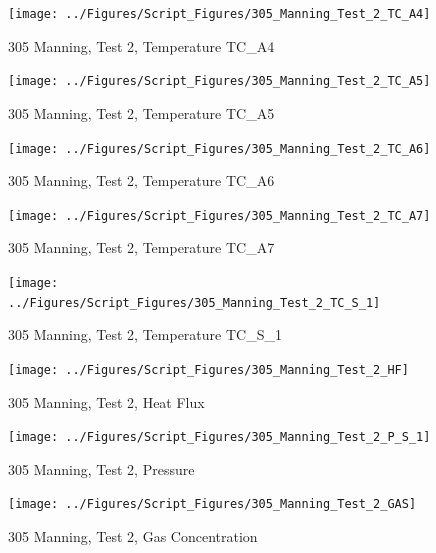 \documentclass[12pt,oneside]{book}
\begin{document}
\begin{figure}[!ht]
\texttt{[image: ../Figures/Script\_Figures/305\_Manning\_Test\_2\_TC\_A4]}
\caption{305 Manning, Test 2, Temperature TC\_A4}
\label{fig:305_Manning_Test_2_TC_A4}
\end{figure}

\begin{figure}[!ht]
\texttt{[image: ../Figures/Script\_Figures/305\_Manning\_Test\_2\_TC\_A5]}
\caption{305 Manning, Test 2, Temperature TC\_A5}
\label{fig:305_Manning_Test_2_TC_A5}
\end{figure}

\begin{figure}[!ht]
\texttt{[image: ../Figures/Script\_Figures/305\_Manning\_Test\_2\_TC\_A6]}
\caption{305 Manning, Test 2, Temperature TC\_A6}
\label{fig:305_Manning_Test_2_TC_A6}
\end{figure}

\begin{figure}[!ht]
\texttt{[image: ../Figures/Script\_Figures/305\_Manning\_Test\_2\_TC\_A7]}
\caption{305 Manning, Test 2, Temperature TC\_A7}
\label{fig:305_Manning_Test_2_TC_A7}
\end{figure}

\begin{figure}[!ht]
\texttt{[image: ../Figures/Script\_Figures/305\_Manning\_Test\_2\_TC\_S\_1]}
\caption{305 Manning, Test 2, Temperature TC\_S\_1}
\label{fig:305_Manning_Test_2_TC_S_1}
\end{figure}

\begin{figure}[!ht]
\texttt{[image: ../Figures/Script\_Figures/305\_Manning\_Test\_2\_HF]}
\caption{305 Manning, Test 2, Heat Flux}
\label{fig:305_Manning_Test_2_HF}
\end{figure}

\begin{figure}[!ht]
\texttt{[image: ../Figures/Script\_Figures/305\_Manning\_Test\_2\_P\_S\_1]}
\caption{305 Manning, Test 2, Pressure}
\label{fig:305_Manning_Test_2_P_S_1}
\end{figure}

\begin{figure}[!ht]
\texttt{[image: ../Figures/Script\_Figures/305\_Manning\_Test\_2\_GAS]}
\caption{305 Manning, Test 2, Gas Concentration}
\label{fig:305_Manning_Test_2_GAS}
\end{figure}



\end{document}
